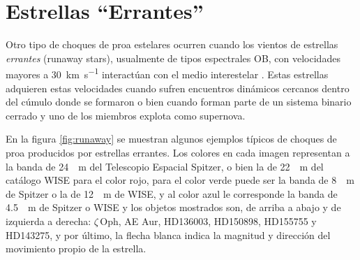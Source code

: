 \section{Estrellas ``Errantes''}
\label{sec:runaway}

Otro tipo de choques de proa estelares ocurren cuando los vientos de estrellas \textit{errantes} (runaway stars), usualmente de tipos espectrales OB, con velocidades mayores a \SI{30}{km.s^{-1}} interactúan con el medio interestelar \citep{Kobulnicky:2016}. Estas estrellas adquieren estas velocidades cuando sufren encuentros dinámicos cercanos dentro del cúmulo donde se formaron o bien cuando forman parte de un sistema binario cerrado y uno de los miembros explota como supernova.

En la figura \ref{fig:runaway} se muestran algunos ejemplos típicos de choques de proa producidos por estrellas errantes. Los colores en cada imagen representan a la banda de \SI{24}{\mu.m} del Telescopio Espacial Spitzer, o bien la de \SI{22}{\mu.m} del catálogo WISE para el color rojo, para el color verde puede ser la banda de \SI{8}{\mu.m} de Spitzer o la de \SI{12}{\mu.m} de WISE, y al color azul le corresponde la banda de \SI{4.5}{\mu.m} de Spitzer o WISE y los objetos mostrados son, de arriba a abajo y de izquierda a derecha: $\zeta$\,Oph, AE Aur, HD136003, HD150898, HD155755 y HD143275, y por último, la flecha blanca indica la magnitud y dirección del movimiento propio de la estrella.

